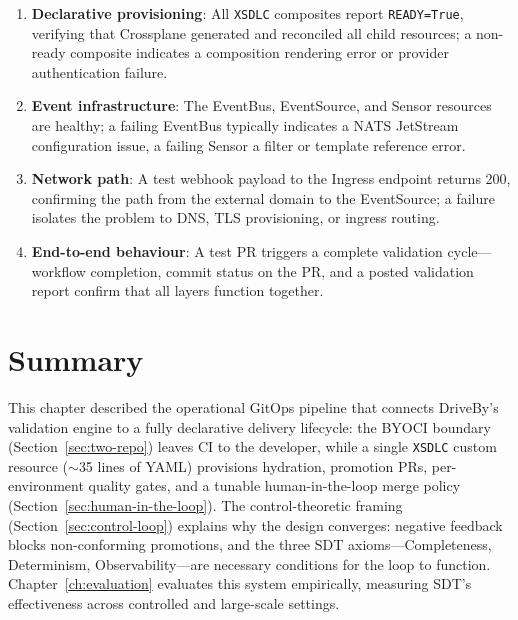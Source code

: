 \begin{enumerate}
    \item \textbf{Declarative provisioning}: All \texttt{XSDLC} composites report \texttt{READY=True}, verifying that Crossplane generated and reconciled all child resources; a non-ready composite indicates a composition rendering error or provider authentication failure.

    \item \textbf{Event infrastructure}: The EventBus, EventSource, and Sensor resources are healthy; a failing EventBus typically indicates a NATS JetStream configuration issue, a failing Sensor a filter or template reference error.

    \item \textbf{Network path}: A test webhook payload to the Ingress endpoint returns 200, confirming the path from the external domain to the EventSource; a failure isolates the problem to DNS, TLS provisioning, or ingress routing.

    \item \textbf{End-to-end behaviour}: A test PR triggers a complete validation cycle---workflow completion, commit status on the PR, and a posted validation report confirm that all layers function together.
\end{enumerate}

\section{Summary}
\label{sec:pipeline-summary}

This chapter described the operational GitOps pipeline that connects DriveBy's validation engine to a fully declarative delivery lifecycle: the BYOCI boundary (Section~\ref{sec:two-repo}) leaves CI to the developer, while a single \texttt{XSDLC} custom resource (\(\sim\)35 lines of YAML) provisions hydration, promotion PRs, per-environment quality gates, and a tunable human-in-the-loop merge policy (Section~\ref{sec:human-in-the-loop}). The control-theoretic framing (Section~\ref{sec:control-loop}) explains why the design converges: negative feedback blocks non-conforming promotions, and the three SDT axioms---Completeness, Determinism, Observability---are necessary conditions for the loop to function. Chapter~\ref{ch:evaluation} evaluates this system empirically, measuring SDT's effectiveness across controlled and large-scale settings.

